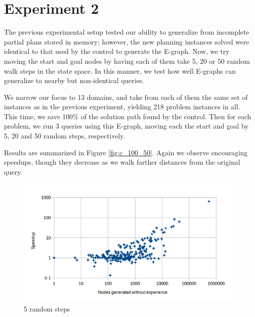 \documentclass[letterpaper]{article}
\begin{document}
\section{Experiment 2}

The previous experimental setup tested our ability to generalize from incomplete partial plans stored in memory; however, the new planning instances solved were identical to that used by the control to generate the E-graph.
Now, we try moving the start and goal nodes by having each of them take 5, 20 or 50 random walk steps in the state space. 
In this manner, we test how well E-graphs can generalize to nearby but non-identical queries.

We narrow our focus to 13 domains, and take from each of them the same set of instances as in the previous experiment, yielding 218 problem instances in all.
This time, we save 100\% of the solution path found by the control.
Then for each problem, we run 3 queries using this E-graph, moving each the start and goal by 5, 20 and 50 random steps, respectively.

Results are summarized in Figure \ref{fig:c_100_50}.
Again we observe encouraging speedups, though they decrease as we walk farther distances from the original query.

\begin{figure}
	\begin{center}
	\includegraphics[scale=0.5]{Speedup_100_5.png}
	\end{center}
	\caption{5 random steps}
	 \label{fig:s_100_5}
\end{figure}
\end{document}
